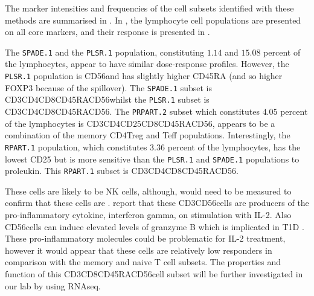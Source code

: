 The marker intensities and frequencies of the cell subsets identified with these methods are summarised in .
In , the lymphocyte cell populations are presented on all core markers, and their response is presented in .

The \texttt{SPADE.1} and the \texttt{PLSR.1} population, constituting $1.14$ and $15.08$ percent of the lymphocytes, appear to have similar dose-response profiles.
However, the \texttt{PLSR.1} population is CD56\negative and has slightly higher CD45RA (and so higher FOXP3 because of the spillover).
The \texttt{SPADE.1} subset is CD3\positive CD4\negative CD8\positive CD45RA\positive CD56\positive whilst the \texttt{PLSR.1} subset is CD3\positive CD4\negative CD8\positive CD45RA\high CD56\negative.
The \texttt{PRPART.2} subset which constitutes $4.05$ percent of the lymphocytes is CD3\positive CD4\high CD25\high CD8\negative CD45RA\negative CD56\negative, appears to be a combination of the memory CD4\positive Treg and Teff populations.
Interestingly, the \texttt{RPART.1} population, which constitutes 3.36 percent of the lymphocytes, has the lowest CD25 but is more sensitive than the \texttt{PLSR.1} and \texttt{SPADE.1} populations to proleukin.  
This \texttt{RPART.1} subset is CD3\negative CD4\negative CD8\negative CD45RA\positive CD56\positive.


These cells are likely to be NK cells, although,  would need to be measured to confirm that these cells are \positive.
\citet{Ortaldo:1992tr} report that these CD3\negative CD56\positive cells are producers of the pro-inflammatory cytokine, interferon gamma, on stimulation with IL-2.
Also CD56\positive cells can induce elevated levels of granzyme B which is implicated in \gls{T1D} \citep{Thomas:2010cy}.
These pro-inflammatory molecules could be problematic for IL-2 treatment, however it would appear that these cells are relatively low responders in comparison with the memory and naive T cell subsets.
The properties and function of this CD3\negative CD8\negative CD45RA\positive CD56\positive cell subset will be further investigated in our lab by  using RNAseq.


